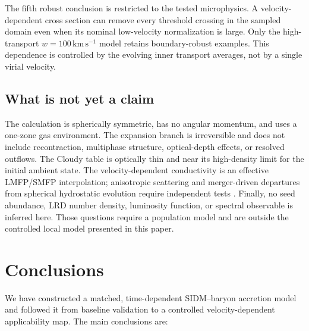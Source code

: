 \documentclass[11pt]{article}
\newcommand{\kms}{\,\mathrm{km\,s^{-1}}}
\begin{document}
The fifth robust conclusion is restricted to the tested microphysics.  A velocity-dependent cross section can remove every threshold crossing in the sampled domain even when its nominal low-velocity normalization is large.  Only the high-transport $w=100\kms$ model retains boundary-robust examples.  This dependence is controlled by the evolving inner transport averages, not by a single virial velocity.

\subsection{What is not yet a claim}

The calculation is spherically symmetric, has no angular momentum, and uses a one-zone gas environment.  The expansion branch is irreversible and does not include recontraction, multiphase structure, optical-depth effects, or resolved outflows.  The Cloudy table is optically thin and near its high-density limit for the initial ambient state.  The velocity-dependent conductivity is an effective LMFP/SMFP interpolation; anisotropic scattering and merger-driven departures from spherical hydrostatic evolution require independent tests \citep{Robertson2017,Silverman2026}.  Finally, no seed abundance, LRD number density, luminosity function, or spectral observable is inferred here.  Those questions require a population model and are outside the controlled local model presented in this paper.

\section{Conclusions}
\label{sec:conclusions}

We have constructed a matched, time-dependent SIDM--baryon accretion model and followed it from baseline validation to a controlled velocity-dependent applicability map.  The main conclusions are:
\end{document}
